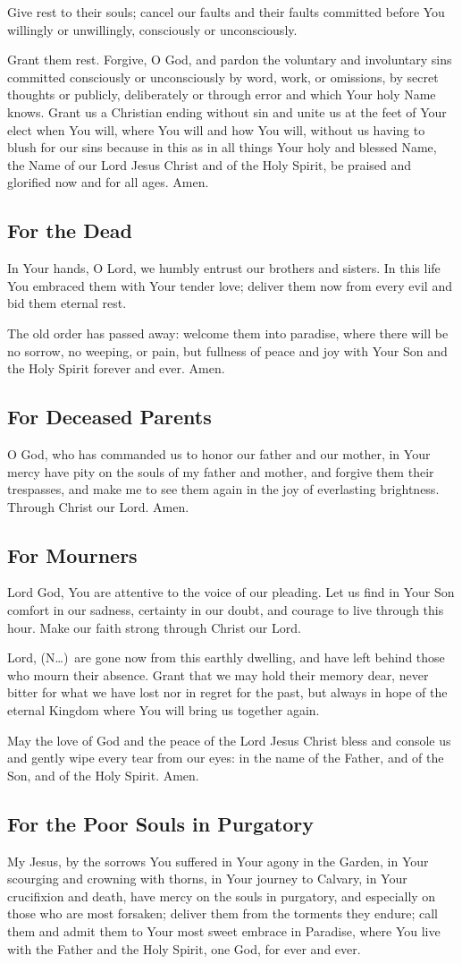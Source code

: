 \documentclass[12pt]{article}
\newcommand{\prayertitle}[1]{\subsection{#1}}
\newcommand{\insertname}{(N\dots)}
\begin{document}
Give rest to their souls;
cancel our faults and their faults committed before You willingly or unwillingly, consciously or unconsciously.

Grant them rest.
Forgive, O God, and pardon the voluntary and involuntary sins committed consciously or unconsciously by word, work, or omissions, by secret thoughts or publicly, deliberately or through error and which Your holy Name knows.
Grant us a Christian ending without sin and unite us at the feet of Your elect when You will, where You will and how You will, without us having to blush for our sins because in this as in all things Your holy and blessed Name, the Name of our Lord Jesus Christ and of the Holy Spirit, be praised and glorified now and for all ages. Amen.

\prayertitle{For the Dead}
\label{prayer:dead}
In Your hands, O Lord, we humbly entrust our brothers and sisters.
In this life You embraced them with Your tender love;
deliver them now from every evil and bid them eternal rest.

The old order has passed away:
welcome them into paradise, where there will be no sorrow, no weeping, or pain,
but fullness of peace and joy with Your Son and the Holy Spirit forever and ever.
Amen.

\prayertitle{For Deceased Parents}
O God, who has commanded us to honor our father and our mother, in Your mercy have pity on the souls of my father and mother, and forgive them their trespasses, and make me to see them again in the joy of everlasting brightness. Through Christ our Lord. Amen.

\prayertitle{For Mourners}
\label{prayer:mourners}
Lord God, You are attentive to the voice of our pleading.
Let us find in Your Son comfort in our sadness, certainty in our doubt, and courage to live through this hour.
Make our faith strong through Christ our Lord.

Lord, \insertname\ are gone now from this earthly dwelling, and have left behind those who mourn their absence.
Grant that we may hold their memory dear, never bitter for what we have lost
nor in regret for the past, but always in hope of the eternal Kingdom where You will bring us together again.

May the love of God and the peace of the Lord Jesus Christ bless and console us and gently wipe every tear from our eyes:
in the name of the Father, and of the Son, and of the Holy Spirit.
Amen.

\prayertitle{For the Poor Souls in Purgatory}
\label{prayer:poor_souls_purgatory}
My Jesus, by the sorrows You suffered in Your agony in the Garden, in Your scourging and crowning with thorns, in Your journey to Calvary, in Your crucifixion and death, have mercy on the souls in purgatory, and especially on those who are most forsaken;
deliver them from the torments they endure;
call them and admit them to Your most sweet embrace in Paradise, where You live with the Father and the Holy Spirit, one God, for ever and ever.
\end{document}
